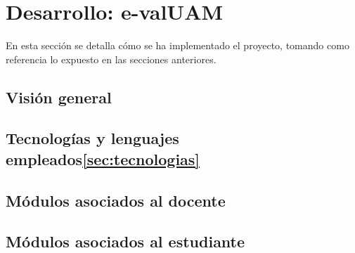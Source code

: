 








\section{Desarrollo: e-valUAM\label{sec:desarrollo}}

En esta sección se detalla cómo se ha implementado el proyecto, tomando como referencia lo expuesto en las secciones anteriores.

\subsection{Visión general}

\subsection{Tecnologías y lenguajes empleados\ref{sec:tecnologias}}

\subsection{Módulos asociados al docente}

\subsection{Módulos asociados al estudiante}

